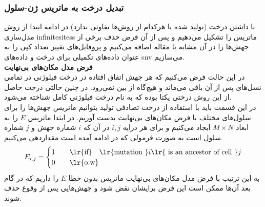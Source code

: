 \subsubsection{تبدیل درخت به ماتریس ژن-سلول}
با داشتن درخت (تولید شده با هرکدام از روش‌ها تفاوتی ندارد) در ادامه ابتدا از روش مدل‌سازی \glspl{infinitesites} ماتریس را تشکیل می‌دهیم و پس از آن فرض حذف برخی از جهش‌ها را در آن مشابه با مقاله  اضافه می‌کنیم و پروفایل‌های تغییر تعداد کپی را به عنوان داده‌های تکمیلی برای درخت و داده‌های \gls{snv} می‌سازیم.
\\
\noindent\textbf{فرض مدل مکان‌های بی‌نهایت}\\
در این حالت فرض می‌کنیم که هر جهش اتفاق افتاده در درخت فیلوژنی در تمامی نسل‌های پس از آن باقی می‌ماند و هیچ‌گاه از بین نمی‌رود. در چنین حالتی درخت حاصل از این روش درختی یکتا بوده که به نام درخت فیلوژنی کامل شناخته می‌شود.
\\
در این قسمت باید با استفاده از درخت تصادفی تولید بتوانیم ماتریس جهش‌ها را برای سلول‌های مختلف با فرض مکان‌های بی‌نهایت بدست آوریم. 
در ابتدا ماتریس $E$ را به ابعاد $M\times N$ ایجاد می‌کنیم و برای هر درایه $i,j$ در آن که $i$ شماره جهش و $j$ شماره سلول است به صورت فرمولی که در ادامه آمده است مقداردهی می‌کنیم.
\begin{equation}
	E_{i,j} = 
	\begin{cases} 
		1  \quad &\text{\lr{if}} \quad \text{\lr{mutation }} i \text{\lr{ is an ancestor of cell }} j \\
		0 \quad &\text{\lr{o.w}}
	\end{cases}
\end{equation}
به این ترتیب با فرض مدل مکان‌های بی‌نهایت ماتریس بدون خطا $E$ را داریم که در گام بعد آن‌ها ممکن است این فرض برایشان نقض شود و جهش‌هایی پس از وقوع حذف شوند.

